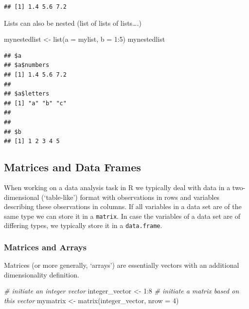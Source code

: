 \documentclass[
  12pt,
]{style/krantz}
\newenvironment{Shaded}{\begin{snugshade}}{\end{snugshade}}
\newcommand{\AttributeTok}[1]{\textcolor[rgb]{0.77,0.63,0.00}{#1}}
\newcommand{\CommentTok}[1]{\textcolor[rgb]{0.56,0.35,0.01}{\textit{#1}}}
\newcommand{\DecValTok}[1]{\textcolor[rgb]{0.00,0.00,0.81}{#1}}
\newcommand{\FunctionTok}[1]{\textcolor[rgb]{0.00,0.00,0.00}{#1}}
\newcommand{\NormalTok}[1]{#1}
\newcommand{\OtherTok}[1]{\textcolor[rgb]{0.56,0.35,0.01}{#1}}
\newcommand{\SpecialCharTok}[1]{\textcolor[rgb]{0.00,0.00,0.00}{#1}}
\begin{document}
\begin{verbatim}
## [1] 1.4 5.6 7.2
\end{verbatim}

Lists can also be nested (list of lists of lists\ldots.)

\begin{Shaded}
\begin{Highlighting}[]
\NormalTok{mynestedlist }\OtherTok{\textless{}{-}} \FunctionTok{list}\NormalTok{(}\AttributeTok{a =}\NormalTok{ mylist, }\AttributeTok{b =} \DecValTok{1}\SpecialCharTok{:}\DecValTok{5}\NormalTok{)}
\NormalTok{mynestedlist}
\end{Highlighting}
\end{Shaded}

\begin{verbatim}
## $a
## $a$numbers
## [1] 1.4 5.6 7.2
## 
## $a$letters
## [1] "a" "b" "c"
## 
## 
## $b
## [1] 1 2 3 4 5
\end{verbatim}

\hypertarget{matrices-and-data-frames}{%
\subsection{Matrices and Data Frames}\label{matrices-and-data-frames}}

When working on a data analysis task in R we typically deal with data in a two-dimensional (`table-like') format with observations in rows and variables describing these observations in columns. If all variables in a data set are of the same type we can store it in a \texttt{matrix}. In case the variables of a data set are of differing types, we typically store it in a \texttt{data.frame}.

\hypertarget{matrices-and-arrays}{%
\subsubsection{Matrices and Arrays}\label{matrices-and-arrays}}

Matrices (or more generally, `arrays') are essentially vectors with an additional dimensionality definition.

\begin{Shaded}
\begin{Highlighting}[]
\CommentTok{\# initiate an integer vector}
\NormalTok{integer\_vector }\OtherTok{\textless{}{-}} \DecValTok{1}\SpecialCharTok{:}\DecValTok{8}
\CommentTok{\# initiate a matrix based on this vector}
\NormalTok{mymatrix }\OtherTok{\textless{}{-}} \FunctionTok{matrix}\NormalTok{(integer\_vector, }\AttributeTok{nrow =} \DecValTok{4}\NormalTok{)}
\end{Highlighting}
\end{Shaded}
\end{document}
